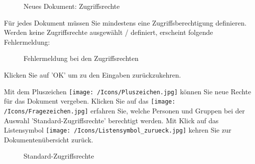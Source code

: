 \begin{figure}[H]
\caption{Neues Dokument: Zugriffsrechte}
\end{figure}

Für jedes Dokument müssen Sie mindestens eine Zugriffsberechtigung definieren. Werden keine Zugriffsrechte ausgewählt / definiert, erscheint folgende Fehlermeldung:

\begin{figure}[H]
\caption{Fehlermeldung bei den Zugriffsrechten}
\end{figure}

Klicken Sie auf 'OK' um zu den Eingaben zurückzukehren. 

\vspace{\baselineskip}

Mit dem Pluszeichen \texttt{[image: /Icons/Pluszeichen.jpg]}  können Sie neue Rechte für das Dokument vergeben. 
Klicken Sie auf das \texttt{[image: /Icons/Fragezeichen.jpg]}  erfahren Sie, welche Personen und Gruppen bei der Auswahl 'Standard-Zugriffsrechte' berechtigt werden.
Mit Klick auf das Listensymbol \texttt{[image: /Icons/Listensymbol\_zurueck.jpg]}  kehren Sie zur Dokumentenübersicht zurück.

\begin{figure}[H]
\caption{Standard-Zugriffsrechte}
\end{figure}

